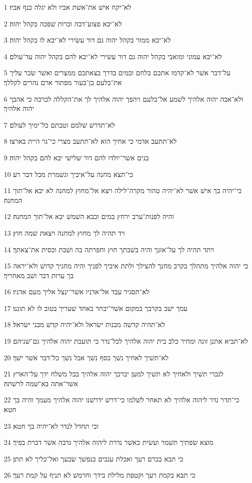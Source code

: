 \par 1 לא־יקח אישׁ את־אשׁת אביו ולא יגלה כנף אביו׃
\par 2 לא־יבא פצוע־דכה וכרות שׁפכה בקהל יהוה׃
\par 3 לא־יבא ממזר בקהל יהוה גם דור עשׂירי לא־יבא לו בקהל יהוה׃
\par 4 לא־יבא עמוני ומואבי בקהל יהוה גם דור עשׂירי לא־יבא להם בקהל יהוה עד־עולם׃
\par 5 על־דבר אשׁר לא־קדמו אתכם בלחם ובמים בדרך בצאתכם ממצרים ואשׁר שׂכר עליך את־בלעם בן־בעור מפתור ארם נהרים לקללך׃
\par 6 ולא־אבה יהוה אלהיך לשׁמע אל־בלעם ויהפך יהוה אלהיך לך את־הקללה לברכה כי אהבך יהוה אלהיך׃
\par 7 לא־תדרשׁ שׁלמם וטבתם כל־ימיך לעולם׃
\par 8 לא־תתעב אדמי כי אחיך הוא לא־תתעב מצרי כי־גר היית בארצו׃
\par 9 בנים אשׁר־יולדו להם דור שׁלישׁי יבא להם בקהל יהוה׃
\par 10 כי־תצא מחנה על־איביך ונשׁמרת מכל דבר רע׃
\par 11 כי־יהיה בך אישׁ אשׁר לא־יהיה טהור מקרה־לילה ויצא אל־מחוץ למחנה לא יבא אל־תוך המחנה׃
\par 12 והיה לפנות־ערב ירחץ במים וכבא השׁמשׁ יבא אל־תוך המחנה׃
\par 13 ויד תהיה לך מחוץ למחנה ויצאת שׁמה חוץ׃
\par 14 ויתד תהיה לך על־אזנך והיה בשׁבתך חוץ וחפרתה בה ושׁבת וכסית את־צאתך׃
\par 15 כי יהוה אלהיך מתהלך בקרב מחנך להצילך ולתת איביך לפניך והיה מחניך קדושׁ ולא־יראה בך ערות דבר ושׁב מאחריך׃
\par 16 לא־תסגיר עבד אל־אדניו אשׁר־ינצל אליך מעם אדניו׃
\par 17 עמך ישׁב בקרבך במקום אשׁר־יבחר באחד שׁעריך בטוב לו לא תוננו׃
\par 18 לא־תהיה קדשׁה מבנות ישׂראל ולא־יהיה קדשׁ מבני ישׂראל׃
\par 19 לא־תביא אתנן זונה ומחיר כלב בית יהוה אלהיך לכל־נדר כי תועבת יהוה אלהיך גם־שׁניהם׃
\par 20 לא־תשׁיך לאחיך נשׁך כסף נשׁך אכל נשׁך כל־דבר אשׁר ישׁך׃
\par 21 לנכרי תשׁיך ולאחיך לא תשׁיך למען יברכך יהוה אלהיך בכל משׁלח ידך על־הארץ אשׁר־אתה בא־שׁמה לרשׁתה׃
\par 22 כי־תדר נדר ליהוה אלהיך לא תאחר לשׁלמו כי־דרשׁ ידרשׁנו יהוה אלהיך מעמך והיה בך חטא׃
\par 23 וכי תחדל לנדר לא־יהיה בך חטא׃
\par 24 מוצא שׂפתיך תשׁמר ועשׂית כאשׁר נדרת ליהוה אלהיך נדבה אשׁר דברת בפיך׃
\par 25 כי תבא בכרם רעך ואכלת ענבים כנפשׁך שׂבעך ואל־כליך לא תתן׃
\par 26 כי תבא בקמת רעך וקטפת מלילת בידך וחרמשׁ לא תניף על קמת רעך׃

